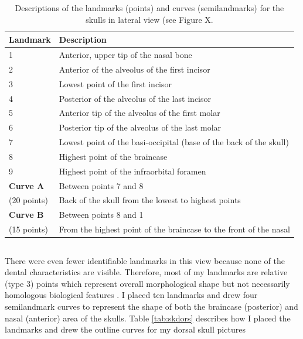\begin{table}[h]
\caption[Skulls: lateral landmarks]
		{Descriptions of the landmarks (points) and curves (semilandmarks) for the skulls in lateral view (see Figure X.} 
\begin{tabular}[t]{l l}		
\hline
\textbf{Landmark} & \textbf{Description} \\
\hline
1 & Anterior, upper tip of the nasal bone\\
2 & Anterior of the alveolus of the first incisor\\
3 & Lowest point of the first incisor\\
4& Posterior of the alveolus of the last incisor \\
5 & Anterior tip of the alveolus of the first molar\\
6 & Posterior tip of the alveolus of the last molar\\
7 & Lowest point of the basi-occipital (base of the back of the skull)\\
8 & Highest point of the braincase\\
9 & Highest point of the infraorbital foramen\\
\hline
\textbf{Curve A} & Between points 7 and 8  \\
(20 points)& Back of the skull from the lowest to highest points\\
\textbf{Curve B} & Between points 8 and 1  \\
(15 points)&From the highest point of the braincase to the front of the nasal \\
\hline
\end{tabular}
\label{tab:sklat}
\end{table}

\subsection{}
There were even fewer identifiable landmarks in this view because none of the dental characteristics are visible. Therefore, most of my landmarks are relative (type 3) points which represent overall morphological shape but not necessarily homologous biological features \citep{Zelditch2012}. I placed ten landmarks and drew four semilandmark curves to represent the shape of both the braincase (posterior) and nasal (anterior) area of the skulls. Table \ref{tab:skdors} describes how I placed the landmarks and drew the outline curves for my dorsal skull pictures 

